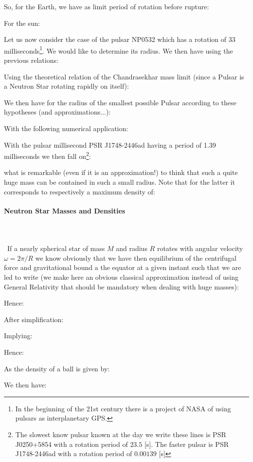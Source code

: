 	So, for the Earth, we have as limit period of rotation before rupture:
	
	For the sun:
	
	Let us now consider the case of the pulsar NP0532 which has a rotation of $33$ milliseconds\footnote{In the beginning of the 21st century there is a project of NASA of using pulsars as interplanetary GPS.}. We would like to determine its radius. We then have using the previous relations:
	
	Using the theoretical relation of the Chandrasekhar mass limit (since a Pulsar is a Neutron Star rotating rapidly on itself):
	
	We then have for the radius of the smallest possible Pulsar according to these hypotheses (and approximations...):
	
	With the following numerical application:
	
	With the pulsar millisecond PSR J1748-2446ad having a period of 1.39 milliseconds we then fall on\footnote{The slowest know pulsar known at the day we write these lines is PSR J0250+5854 with a rotation period of $23.5$ [s]. The faster pulsar is PSR J1748-2446ad with a rotation period of $0.00139$ [s]}:
	
	what is remarkable (even if it is an approximation!) to think that such a quite huge mass can be contained in such a small radius. Note that for the latter it corresponds to respectively a maximum density of:
	

	\paragraph{Neutron Star Masses and Densities}\mbox{}\\\\\
	 If a nearly spherical star of mass $M$ and radius $R$ rotates with angular velocity $\omega=2\pi/R$ we know obviously that we have then equilibrium of the centrifugal force and gravitational bound a the equator at a given instant such that we are led to write (we make here an obvious classical approximation instead of using General Relativity that should be mandatory when dealing with huge masses):
	
	Hence:
	
	After simplification:
	
	Implying:
	
	Hence:
	
	As the density of a ball is given by:
	
	We then have:
	

